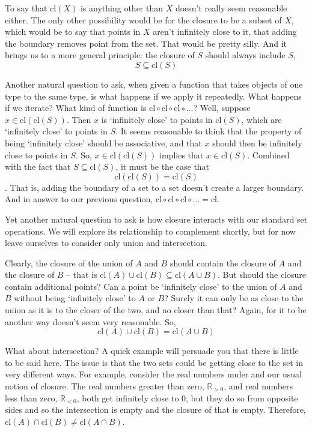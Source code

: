 \documentclass{report}
\newcommand{\cl}{\mathrm{cl}}
\begin{document}
To say that $\cl(X)$ is anything other than $X$ doesn't really seem reasonable either. The only other possibility would be for the closure to be a subset of $X$, which would be to say that points in $X$ aren't infinitely close to it, that adding the boundary removes point from the set. That would be pretty silly. And it brings us to a more general principle: the closure of $S$ should always include $S$,
\begin{equation}
S ⊆ \cl(S) \tag{Closure 2}
\end{equation}

Another natural question to ask, when given a function that takes objects of one type to the same type, is what happens if we apply it repeatedly. What happens if we iterate? What kind of function is $\cl ∘ \cl ∘ \cl ∘ ...$? Well, suppose $x ∈ \cl(\cl(S))$. Then $x$ is `infinitely close' to points in $\cl(S)$, which are `infinitely close' to points in $S$. It seems reasonable to think that the property of being `infinitely close' should be associative, and that $x$ should then be infinitely close to points in $S$. So, $x ∈ \cl(\cl(S))$ implies that $x ∈ \cl(S)$. Combined with the fact that $S ⊆ \cl(S)$, it must be the case that 
\begin{equation}
\cl(\cl(S)) = \cl(S) \tag{Closure 3}
\end{equation}
. That is, adding the boundary of a set to a set doesn't create a larger boundary. And in answer to our previous question, $\cl ∘ \cl ∘ \cl ∘ ... = \cl$.

Yet another natural question to ask is how closure interacts with our standard set operations. We will explore its relationship to complement shortly, but for now leave ourselves to consider only union and intersection.

Clearly, the closure of the union of $A$ and $B$ should contain the closure of $A$ and the closure of $B$ -- that is $\cl(A)∪\cl(B) ⊆ \cl(A∪B)$. But should the closure contain additional points? Can a point be `infinitely close' to the union of $A$ and $B$ without being `infinitely close' to $A$ or $B$? Surely it can only be as close to the union as it is to the closer of the two, and no closer than that? Again, for it to be another way doesn't seem very reasonable. So, 
\begin{equation}
\cl(A)∪\cl(B) = \cl(A∪B) \tag{Closure 4}
\end{equation}

What about intersection? A quick example will persuade you that there is little to be said here. The issue is that the two sets could be getting close to the set in very different ways. For example, consider the real numbers under and our usual notion of closure. The real numbers greater than zero, $ℝ_{>0}$, and real numbers less than zero, $ℝ_{<0}$, both get infinitely close to $0$, but they do so from opposite sides and so the intersection is empty and the closure of that is empty. Therefore, $\cl(A)∩\cl(B) ≠ \cl(A∩B)$.
\end{document}
